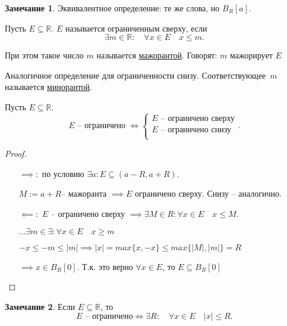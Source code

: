 \documentclass{book}
\newcommand\R{\ensuremath{\mathbb{R}}}
\theoremstyle{definition}
\newtheorem*{note}{Замечание}
\begin{document}
    \begin{note}
        Эквивалентное определение: те же слова, но $B_R[a]$.
    \end{note}

    \begin{definition}
        Пусть $E \subseteq \R$. 
        $E$ называется ограниченным сверху, если 
        \[ \exists m\in \R:\quad \forall x\in E\quad x\leqslant m.\] 

        При этом такое число $m$ называется \underline{мажорантой}.
        Говорят: $m$ мажорирует $E$

        Аналогичное определение для ограниченности снизу. 
        Соответствующее~$m$ называется \underline{минорантой}.
    \end{definition}

    \begin{statement}
        Пусть $E\subseteq \R$.
        \[
        E \text{ -- ограничено } \iff  \begin{cases}
            E \text{ --  ограничено сверху}\\
            E \text{ -- ограничено снизу}\\
        \end{cases}
        .\] 
    \end{statement}
    \begin{proof}
    \begin{itemize}
        \item[$\implies:$]
            по условию $\exists a: E\subseteq (a-R, a+R)$.

            $M:=a+R$-- мажоранта $\implies E$ ограничено сверху. 
            Снизу -- аналогично.
        
            \item[$\impliedby:$]
            $E$ -- ограничено сверху $\implies \exists M\in R: \forall x\in E\quad x\leqslant M$.

            $\ldots \exists m\in \exists : \forall x\in E\quad x\geqslant m$

            $-x\leqslant -m \leqslant |m| \implies  |x| = max\{x, -x\}\leqslant max\{|M|, |m|\} = R$

            $\implies  x\in B_R[0]$. Т.к. это верно $\forall x\in E$, то $E    \subseteq  B_R[0]$
        \end{itemize}
    \end{proof}

    \begin{note}
        Если $E\subseteq \R$, то 
        \[
            E \text{ -- ограничено} \iff  \exists R:\quad \forall x\in E\quad |x|\leqslant R.
        \] 
    \end{note}
\end{document}
